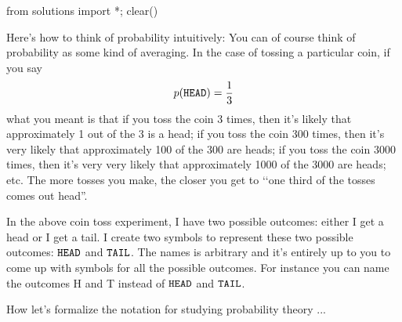 \begin{python0}
from solutions import *; clear()
\end{python0}

Here's how to think of probability intuitively:
You can of course think of probability as some kind of averaging.
In the case of tossing a particular coin, if you say
\[
p(\texttt{HEAD}) = \frac{1}{3}
\]
what you meant is that if you toss the coin 3 times, then
it's likely that 
approximately 1 out of the 3 is a head;
if you toss the coin 300 times, then it's very likely that
approximately 100 of the 300 are heads;
if you toss the coin 3000 times, then it's very very likely that
approximately 1000 of the 3000 are heads; etc.
The more tosses you make, the closer you get to \lq\lq one third of the
tosses comes out head''.

In the above coin toss experiment, I have two possible outcomes:
either I get a head or I get a tail.
I create two symbols to represent these two possible outcomes:
$\texttt{HEAD}$ and $\texttt{TAIL}$.
The names is arbitrary and it's entirely up to you to come up with
symbols for all the possible outcomes.
For instance you can name the outcomes H and T instead of
$\texttt{HEAD}$ and $\texttt{TAIL}$.

How let's formalize the notation for studying probability theory ...

